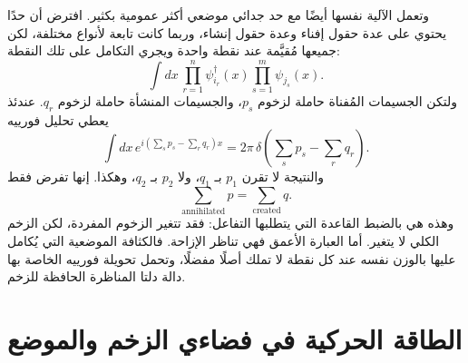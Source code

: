 \begin{classroomqa}
\end{classroomqa}

وتعمل الآلية نفسها أيضًا مع حد جدائي موضعي أكثر عمومية بكثير. افترض أن حدًا يحتوي على عدة حقول إفناء وعدة حقول إنشاء، وربما كانت تابعة لأنواع مختلفة، لكن جميعها مُقيَّمة عند نقطة واحدة ويجري التكامل على تلك النقطة:
\begin{equation}
\int dx\,
\prod_{r=1}^{n} \psi_{i_r}^\dagger(x)
\prod_{s=1}^{m} \psi_{j_s}(x).
\end{equation}
ولتكن الجسيمات المُفناة حاملة لزخوم \(p_s\)، والجسيمات المنشأة حاملة لزخوم \(q_r\). عندئذ يعطي تحليل فورييه
\begin{equation}
\int dx\,
e^{i(\sum_s p_s-\sum_r q_r)x}
=2\pi\,
\delta\!\left(\sum_s p_s-\sum_r q_r\right).
\label{eq:l9-total-momentum-delta}
\end{equation}
والنتيجة لا تقرن \(p_1\) بـ \(q_1\)، ولا \(p_2\) بـ \(q_2\)، وهكذا. إنها تفرض فقط
\begin{equation}
\sum_{\mathrm{annihilated}}p
=
\sum_{\mathrm{created}}q.
\end{equation}
وهذه هي بالضبط القاعدة التي يتطلبها التفاعل: فقد تتغير الزخوم المفردة، لكن الزخم الكلي لا يتغير. أما العبارة الأعمق فهي تناظر الإزاحة. فالكثافة الموضعية التي يُكامل عليها بالوزن نفسه عند كل نقطة لا تملك أصلًا مفضلًا، وتحمل تحويلة فورييه الخاصة بها دالة دلتا المناظرة الحافظة للزخم.

\begin{classroomqa}
\end{classroomqa}

\section{الطاقة الحركية في فضاءي الزخم والموضع}

